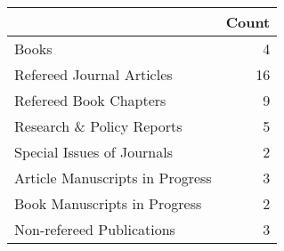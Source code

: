 \begin{tabular}{lr}
\toprule
 & Count \\
\midrule
Books & 4 \\
Refereed Journal Articles & 16 \\
Refereed Book Chapters & 9 \\
Research \& Policy Reports & 5 \\
Special Issues of Journals & 2 \\
Article Manuscripts in Progress & 3 \\
Book Manuscripts in Progress & 2 \\
Non-refereed Publications & 3 \\
\bottomrule
\end{tabular}

